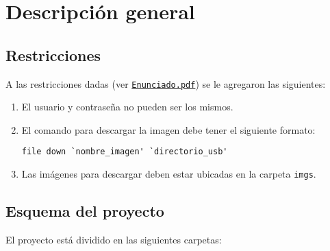 \documentclass[12pt,a4paper]{article}
\begin{document}
\section{Descripción general}
\label{desc}

\subsection{Restricciones}
\label{restrictions}
A las restricciones dadas (ver \href{run:../Enunciado.pdf}
{\texttt{Enunciado.pdf}}) se le agregaron las siguientes:

\begin{enumerate}[leftmargin=1.5cm]
  \item El usuario y contraseña no pueden ser los mismos.
  \item El comando para descargar la imagen debe tener el
  siguiente formato:

  \begin{center}
    \verb|file down `nombre_imagen' `directorio_usb'|
  \end{center}

  \item Las imágenes para descargar deben estar ubicadas en la
  carpeta \verb|imgs|.
\end{enumerate}


\subsection{Esquema del proyecto}
\label{esq}

El proyecto está dividido en las siguientes carpetas:
\end{document}
